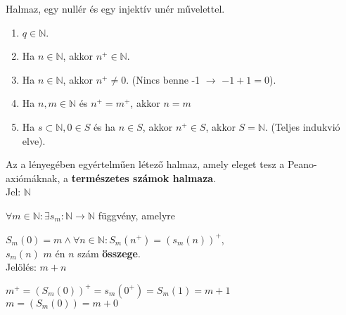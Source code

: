 \begin{frame}
  \begin{tcolorbox}[title={Def.: Természetes számok}]
    Halmaz, egy nullér és egy injektív unér művelettel.
  \end{tcolorbox}

  \begin{tcolorbox}[title={Def.: Peano-axiómák}]
      \begin{enumerate}
        \item $q \in \mathbb{N}$.
        \item Ha $n \in \mathbb{N}$, akkor $n^+ \in \mathbb{N}$.
        \item Ha $n \in \mathbb{N}$, akkor $n^+ \neq 0$. (Nincs benne -1 $\rightarrow$ $-1 + 1 = 0$).
        \item Ha $n, m \in \mathbb{N}$ és $n^+ = m^+$, akkor $n = m$
        \item Ha $s \subset \mathbb{N}, 0 \in S$ és ha $n \in S$, akkor $n^+ \in S$, akkor $S = \mathbb{N}$. (Teljes indukvió elve).
      \end{enumerate}
  \end{tcolorbox}

  \begin{tcolorbox}[title={Ész}]
  \end{tcolorbox}

  \begin{tcolorbox}[title={Def.: Természetes számok halmaza}]
    Az a lényegében egyértelműen létező halmaz, amely eleget tesz a Peano-axiómáknak, a \textbf{természetes számok halmaza}.\\
    Jel: $\mathbb{N}$
  \end{tcolorbox}
\end{frame}

\begin{frame}
  \begin{tcolorbox}[title={Def.: Összeadás}]
    ${\forall}m \in \mathbb{N} : {\exists} s_m : \mathbb{N} \rightarrow \mathbb{N}$ függvény, amelyre\\
    \mmedskip

    $S_m(0) = m \land {\forall}n \in \mathbb{N} : S_m(n^+) = (s_m(n))^+$,\\
    $s_m(n)$ $m$ én $n$ szám \textbf{összege}.\\
    Jelölés: $m + n$
  \end{tcolorbox}

  \begin{tcolorbox}[title={Ész}]
    $m^+ = (S_m(0))^+ = s_m(0^+) = S_m(1) = m + 1$\\
    $m = (S_m(0)) = m + 0$
  \end{tcolorbox}
\end{frame}

